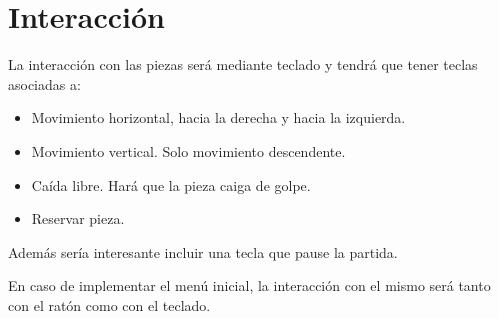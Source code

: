 \documentclass[11pt,a4paper]{article}
\begin{document}
\section{Interacción}

La interacción con las piezas será mediante teclado y tendrá que tener teclas asociadas a:

\begin{itemize}
    \item Movimiento horizontal, hacia la derecha y hacia la izquierda.
    \item Movimiento vertical. Solo movimiento descendente.
    \item Caída libre. Hará que la pieza caiga de golpe.
    \item Reservar pieza.
\end{itemize}

Además sería interesante incluir una tecla que pause la partida.

En caso de implementar el menú inicial, la interacción con el mismo será tanto con el ratón como con el teclado.
\end{document}
